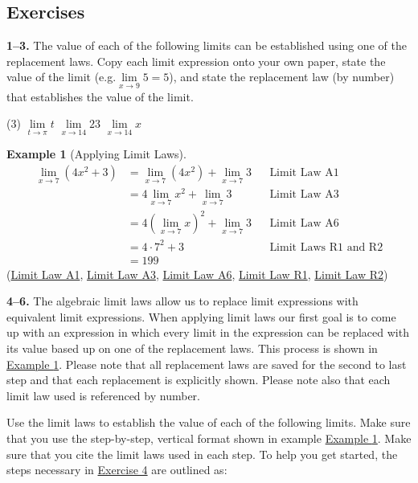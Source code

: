 \documentclass[10pt,oneside,]{book}
\theoremstyle{plain}
\theoremstyle{definition}
\newtheorem{example}[theorem]{Example}
\numberwithin{equation}{section}
\begin{document}
\subsection[Exercises]{Exercises}\label{exercises-6}
\textbf{1--3. }\hypertarget{exercisegroup-16}{\null}The value of each of the following limits can be established using one of the replacement laws. Copy each limit expression onto your own paper, state the value of the limit (e.g.\@ \(\lim\limits_{x\to9}5=5\)), and state the replacement law (by number) that establishes the value of the limit.%
\par
\begin{exercisegroup}(3)
\exercise[1.]\hypertarget{exercise-66}{\null}\(\lim\limits_{t\to\pi}t\)%
\exercise[2.]\hypertarget{exercise-67}{\null}\(\lim\limits_{x\to14}23\)%
\exercise[3.]\hypertarget{exercise-68}{\null}\(\lim\limits_{x\to14}x\)%
\end{exercisegroup}
\par\smallskip\noindent
\begin{example}[Applying Limit Laws]\label{example-apply-limit-laws}
\begin{align*}
\lim_{x\to7}\left(4x^2+3\right)&=\lim_{x\to7}\left(4x^2\right)+\lim_{x\to7}3&&\text{Limit Law A1}\\
&=4\lim_{x\to7}x^2+\lim_{x\to7}3&&\text{Limit Law A3}\\
&=4\left(\lim_{x\to7}x\right)^2+\lim_{x\to7}3&&\text{Limit Law A6}\\
&=4\cdot7^2+3&&\text{Limit Laws R1 and R2}\\
&=199
\end{align*}(\hyperref[lla1]{Limit Law A1}, \hyperref[lla3]{Limit Law A3}, \hyperref[lla6]{Limit Law A6}, \hyperref[llr1]{Limit Law R1}, \hyperref[llr2]{Limit Law R2})%
\end{example}
\textbf{4--6. }\hypertarget{exercisegroup-17}{\null}The algebraic limit laws allow us to replace limit expressions with equivalent limit expressions. When applying limit laws our first goal is to come up with an expression in which every limit in the expression can be replaced with its value based up on one of the replacement laws. This process is shown in \hyperref[example-apply-limit-laws]{Example \ref{example-apply-limit-laws}}. Please note that all replacement laws are saved for the second to last step and that each replacement is explicitly shown. Please note also that each limit law used is referenced by number.%
\par
Use the limit laws to establish the value of each of the following limits. Make sure that you use the step-by-step, vertical format shown in example \hyperref[example-apply-limit-laws]{Example \ref{example-apply-limit-laws}}. Make sure that you cite the limit laws used in each step. To help you get started, the steps necessary in \hyperlink{exercise-first-apply-limit-laws}{Exercise 4} are outlined as:%
\end{document}
